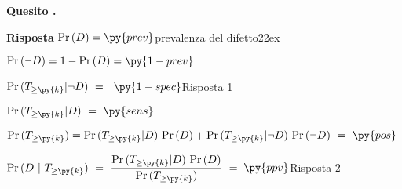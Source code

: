 \documentclass[11pt,twoside,a4paper]{article}
\def\Pr{{\rm Pr\,}}
\newcounter{quesito}
\newenvironment{question}{\bigskip\addtocounter{quesito}{1}\par\textbf{Quesito \thequesito.}}{\vspace{\parskip}}
\newenvironment{answer}{\par\textbf{Risposta\quad}}{\vspace{\parskip}}
\begin{document}
\begin{question}
\begin{answer}
$\Pr(D)=\py{prev}$\hfill prevalenza del difetto\kern22ex

$\Pr(\neg D)=1-\Pr(D)=\py{1-prev}$

$\Pr(T_{\ge\py{k}}| \neg D)\ =\kern1ex${\color{blue} $\py{1-spec}$\hfill Risposta 1} 

$\Pr(T_{\ge\py{k}}| D)\ =\ \py{sens}$

$\Pr(T_{\ge\py{k}})=\Pr(T_{\ge\py{k}}|D)\ \Pr(D) + \Pr(T_{\ge\py{k}}|\neg D)\ \Pr(\neg D)\ =\ \py{pos}$

$\displaystyle\Pr(D ~|~T_{\ge\py{k}})\ =\ \frac{\Pr(T_{\ge\py{k}}| D)\ \Pr(D)}{\Pr(T_{\ge\py{k}})}\ =\kern1ex${\color{blue}$\py{ppv}$\hfill Risposta 2}

\end{answer}
\end{question}
\end{document}

